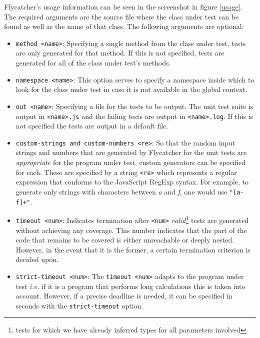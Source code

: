 \textsf{Flycatcher}'s usage information can be seen in the screenshot in figure \ref{usage}. The required arguments are the source file where the class under test can be found as well as the name of that class. The following arguments are optional:

\begin{itemize}
   \item \texttt{\textendash \textendash method <name>}: Specifying a single method from the class under test, tests are only generated for that method. If this is not specified, tests are generated for all of the class under test's methods.
   \item \texttt{\textendash \textendash namespace <name>}: This option serves to specify a namespace inside which to look for the class under test in case it is not available in the global context.
   \item \texttt{\textendash \textendash out <name>}: Specifying a file for the tests to be output. The unit test suite is output in \texttt{<name>.js} and the failing tests are output in \texttt{<name>.log}. If this is not specified the tests are output in a default file.
   \item \texttt{\textendash \textendash custom-strings and \textendash \textendash custom-numbers <re>}: So that the random input strings and numbers that are generated by \textsf{Flycatcher} for the unit tests are \emph{appropriate} for the program under test, custom generators can be specified for each. These are specified by a string \texttt{<re>} which represents a regular expression that conforms to the JavaScript RegExp syntax. For example, to generate only strings with characters between \emph{a} and \emph{f}, one would use \texttt{"[a-f]+"}.
   \item \texttt{\textendash \textendash timeout <num>}: Indicates termination after \texttt{<num>} \emph{valid}\footnote{tests for which we have already inferred types for all parameters involved} tests are generated without achieving any coverage. This number indicates that the part of the code that remains to be covered is either unreachable or deeply nested. However, in the event that it is the former, a certain termination criterion is decided upon.
   \item \texttt{\textendash \textendash strict-timeout <num>}: The \texttt{\textendash \textendash timeout <num>} adapts to the program under test \emph{i.e.} if it is a program that performs long calculations this is taken into account. However, if a precise deadline is needed, it can be specified in seconds with the \texttt{strict-timeout} option.

\end{itemize}

